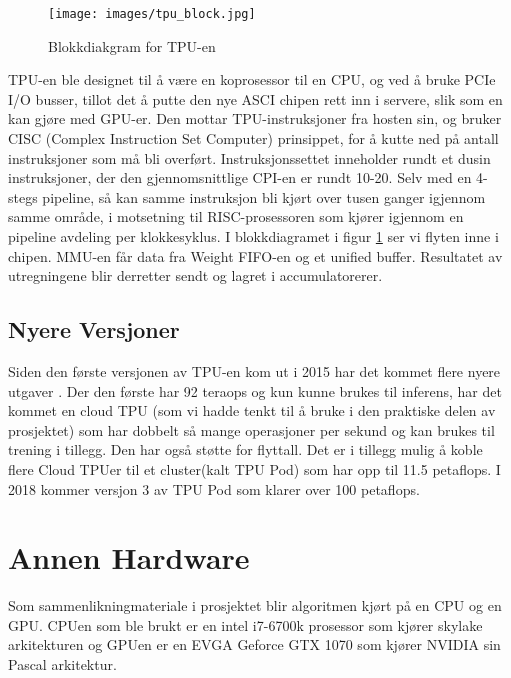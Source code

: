 \begin{figure}[ht]
    \centering
    \texttt{[image: images/tpu\_block.jpg]}
    \caption{Blokkdiakgram for TPU-en}
    \label{fig:blokk}
\end{figure}

TPU-en ble designet til å være en koprosessor til en CPU, og ved å bruke PCIe I/O busser, tillot det å putte den nye ASCI chipen rett inn i servere, slik som en kan gjøre med GPU-er. Den mottar TPU-instruksjoner fra hosten sin, og bruker CISC (Complex Instruction Set Computer) prinsippet, for å kutte ned på antall instruksjoner som må bli overført. Instruksjonssettet inneholder rundt et dusin instruksjoner, der den gjennomsnittlige CPI-en er rundt 10-20. Selv med en 4-stegs pipeline, så kan samme instruksjon bli kjørt over tusen ganger igjennom samme område, i motsetning til RISC-prosessoren som kjører igjennom en pipeline avdeling per klokkesyklus. 
I blokkdiagramet i figur \ref{fig:blokk} ser vi flyten inne i chipen. MMU-en får data fra Weight FIFO-en og et unified buffer. Resultatet av utregningene blir derretter sendt og lagret i accumulatorerer.

\newpage
\subsection{Nyere Versjoner}
Siden den første versjonen av TPU-en kom ut i 2015 har det kommet flere nyere utgaver \cite{tpu_video}. Der den første har 92 teraops og kun kunne brukes til inferens, har det kommet en cloud TPU (som vi hadde tenkt til å bruke i den praktiske delen av prosjektet) som har dobbelt så mange operasjoner per sekund og kan brukes til trening i tillegg. Den har også støtte for flyttall. Det er i tillegg mulig å koble flere Cloud TPUer til et cluster(kalt TPU Pod) som har opp til 11.5 petaflops. I 2018 kommer versjon 3 av TPU Pod som klarer over 100 petaflops.


\newpage
\section{Annen Hardware}
Som sammenlikningmateriale i prosjektet blir algoritmen kjørt på en CPU og en GPU. CPUen som ble brukt er en intel i7-6700k prosessor som kjører skylake arkitekturen og GPUen er en EVGA  Geforce GTX 1070 som kjører NVIDIA sin Pascal arkitektur.


